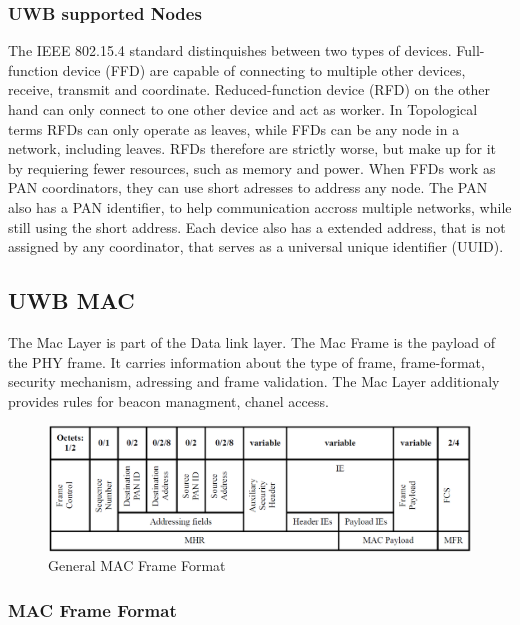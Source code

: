 \subsubsection{UWB supported Nodes}

The IEEE 802.15.4 standard distinquishes between two types of devices.
Full-function device (FFD) are capable of connecting to multiple other devices, receive, transmit and coordinate. Reduced-function device (RFD) on the other hand can only connect to one other device and act as worker. 
In Topological terms RFDs can only operate as leaves, while FFDs can be any node in a network, including leaves.
RFDs therefore are strictly worse, but make up for it by requiering fewer resources, such as memory and power.
When FFDs work as PAN coordinators, they can use short adresses to address any node.
The PAN also has a PAN identifier, to help communication accross multiple networks, while still using the short address.
Each device also has a extended address, that is not assigned by any coordinator, that serves as a universal unique identifier (UUID).


\subsection{UWB MAC}
\label{sec:UWB MAC}

The Mac Layer is part of the Data link layer.
The Mac Frame is the payload of the PHY frame. It carries information about the type of frame, frame-format, security mechanism, adressing and frame validation.
The Mac Layer additionaly provides rules for beacon managment, chanel access.

\begin{figure}[ht!]
	\centering
	\includegraphics[width=\linewidth]{graphics/general_MAC_Frame_Format.png}
	\caption{General MAC Frame Format \cite{IEEE4-2020-7}}
	\label{f:MAC Frame Format}
\end{figure}


\subsubsection{MAC Frame Format}

